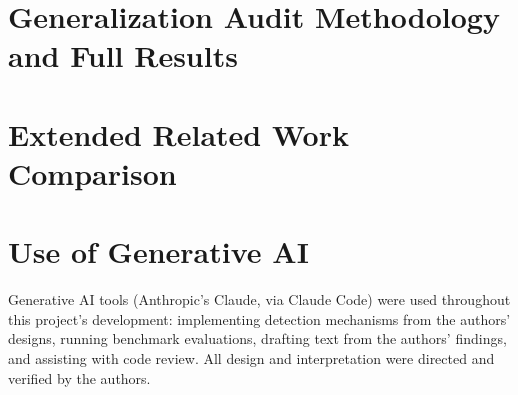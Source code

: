 \documentclass[sigconf,anonymous,review]{acmart}
\begin{document}
\appendix

\section{Generalization Audit Methodology and Full Results}
\label{sec:appendix-generalization}


\section{Extended Related Work Comparison}
\label{sec:appendix-related}

\FloatBarrier




\section*{Use of Generative AI}
Generative AI tools (Anthropic's Claude, via Claude Code) were used
throughout this project's development: implementing detection mechanisms
from the authors' designs, running benchmark evaluations, drafting text
from the authors' findings, and assisting with code review. All design
and interpretation were directed and verified by the authors.
\end{document}
